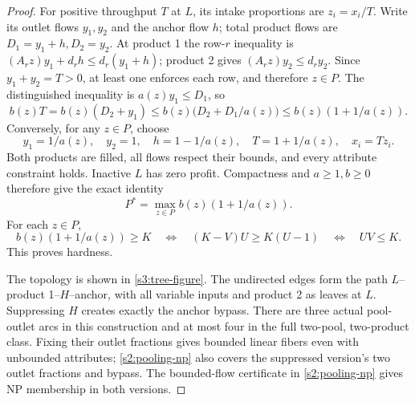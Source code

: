 \begin{proof}
For positive throughput $T$ at $L$, its intake proportions are $z_i=x_i/T$.
Write its outlet flows $y_1,y_2$ and the anchor flow $h$; total product
flows are $D_1=y_1+h,D_2=y_2$. At product 1 the row-$r$ inequality is
$(A_rz)y_1+d_rh\le d_r(y_1+h)$; product 2 gives
$(A_rz)y_2\le d_ry_2$. Since $y_1+y_2=T>0$, at least one enforces
each row, and therefore $z\in P$. The distinguished inequality is
$a(z)y_1\le D_1$, so
\[
 b(z)T=b(z)(D_2+y_1)
 \le b(z)\bigl(D_2+D_1/a(z)\bigr)
 \le b(z)(1+1/a(z)).
\]
Conversely, for any $z\in P$, choose
\begin{equation}
 y_1=1/a(z),\quad y_2=1,\quad h=1-1/a(z),\quad
 T=1+1/a(z),\quad x_i=Tz_i.\label{s3:radial-max}
\end{equation}
Both products are filled, all flows respect their bounds, and every
attribute constraint holds. Inactive $L$ has zero profit. Compactness
and $a\ge1,b\ge0$ therefore give the exact identity
\begin{equation}
 P^*=\max_{z\in P}b(z)(1+1/a(z)).\label{s3:two-pool-value}
\end{equation}
For each $z\in P$,
\begin{equation}
 b(z)(1+1/a(z))\ge K
 \quad\Longleftrightarrow\quad
 (K-V)U\ge K(U-1)
 \quad\Longleftrightarrow\quad UV\le K.\label{s3:threshold-product}
\end{equation}
This proves hardness.

The topology is shown in \cref{s3:tree-figure}. The undirected edges form
the path $L$--product 1--$H$--anchor, with all variable inputs and product 2
as leaves at $L$. Suppressing $H$ creates exactly the anchor bypass.
There are three actual pool-outlet arcs in this construction and at
most four in the full two-pool, two-product class. Fixing their outlet
fractions gives bounded linear fibers even with unbounded attributes;
\cref{s2:pooling-np} also covers the suppressed version's two outlet
fractions and bypass. The bounded-flow
certificate in \cref{s2:pooling-np} gives NP membership in both versions.
\end{proof}

